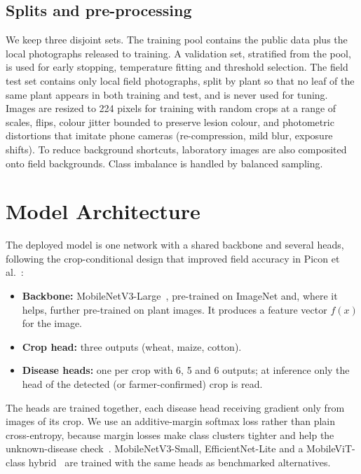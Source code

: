 \subsection{Splits and pre-processing}
We keep three disjoint sets. The training pool contains the public data plus the local photographs released to training. A validation set, stratified from the pool, is used for early stopping, temperature fitting and threshold selection. The field test set contains only local field photographs, split by plant so that no leaf of the same plant appears in both training and test, and is never used for tuning. Images are resized to 224 pixels for training with random crops at a range of scales, flips, colour jitter bounded to preserve lesion colour, and photometric distortions that imitate phone cameras (re-compression, mild blur, exposure shifts). To reduce background shortcuts, laboratory images are also composited onto field backgrounds. Class imbalance is handled by balanced sampling.

\section{Model Architecture}
\label{sec:model}
The deployed model is one network with a shared backbone and several heads, following the crop-conditional design that improved field accuracy in Picon et al.~\cite{picon2019cropcond}:
\begin{itemize}
  \item \textbf{Backbone:} MobileNetV3-Large~\cite{howard2019mnv3}, pre-trained on ImageNet and, where it helps, further pre-trained on plant images. It produces a feature vector $f(x)$ for the image.
  \item \textbf{Crop head:} three outputs (wheat, maize, cotton).
  \item \textbf{Disease heads:} one per crop with 6, 5 and 6 outputs; at inference only the head of the detected (or farmer-confirmed) crop is read.
\end{itemize}
The heads are trained together, each disease head receiving gradient only from images of its crop. We use an additive-margin softmax loss rather than plain cross-entropy, because margin losses make class clusters tighter and help the unknown-disease check~\cite{meng2023osr}. MobileNetV3-Small, EfficientNet-Lite and a MobileViT-class hybrid~\cite{tonmoy2025mobileplantvit} are trained with the same heads as benchmarked alternatives.

